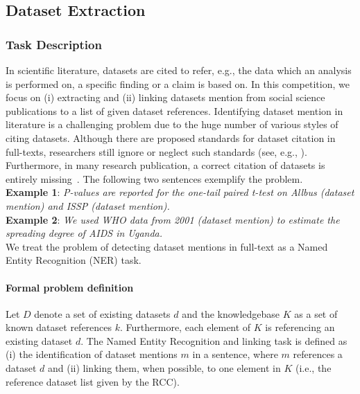 \subsection{Dataset Extraction}
\label{sec:dataset-extraction}
\subsubsection{Task Description}
In scientific literature, datasets are cited to refer, e.g., the data which an analysis is performed on, a specific finding or a claim is based on. In this competition, we focus on (i) extracting and (ii) linking datasets mention from social science publications to a list of given dataset references.
Identifying dataset mention in literature is a challenging problem due to the huge number of various styles of citing datasets. Although there are proposed standards for dataset citation in full-texts, researchers still ignore or neglect such standards (see, e.g., \cite{altman2007proposed}).
Furthermore, in many research publication, a correct citation of datasets is entirely missing~\cite{boland2012identifying}. 
The following two sentences exemplify the problem.\\ 
\textbf{Example 1}: \emph{P-values are reported for the one-tail paired t-test on \emph{Allbus} (dataset mention) and \emph{ISSP} (dataset mention).}\\
\textbf{Example 2}: \emph{We used \emph{WHO data from 2001} (dataset mention) to estimate the spreading degree of AIDS in Uganda.}\\
We treat the problem of detecting dataset mentions in full-text as a Named Entity Recognition (NER) task. 
\paragraph{Formal problem definition}%
Let $D$ denote a set of existing datasets $d$ and the knowledgebase $K$ as a set of known dataset references $k$. Furthermore, each element of $K$ is referencing an existing dataset $d$. The Named Entity Recognition and linking task is defined as (i) the identification of dataset mentions $m$ in a sentence, where $m$ references a dataset $d$ and (ii) linking them, when possible, to one element in $K$ (i.e., the reference dataset list given by the RCC). 


